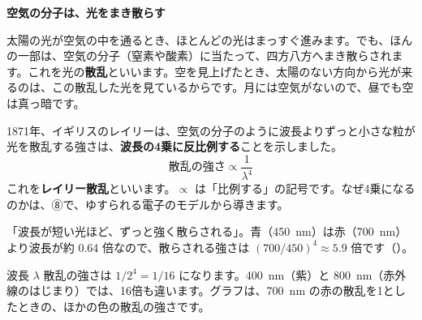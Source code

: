 \noindent\textbf{空気の分子は、光をまき散らす}\par\nobreak
\label{ph:波-13:hatena1}太陽の光が空気の中を通るとき、ほとんどの光はまっすぐ進みます。でも、ほんの一部は、空気の分子（窒素や酸素）に当たって、四方八方へまき散らされます。これを光の\textbf{散乱}といいます。空を見上げたとき、太陽のない方向から光が来るのは、この散乱した光を見ているからです。月には空気がないので、昼でも空は真っ暗です。

1871年、イギリスのレイリーは、空気の分子のように波長よりずっと小さな粒が光を散乱する強さは、\textbf{波長の4乗に反比例する}ことを示しました。
\[ \text{散乱の強さ}\propto\frac{1}{\lambda^4} \]
\label{ph:波-13:rayleigh}これを\textbf{レイリー散乱}といいます。$\propto$ は「比例する」の記号です。なぜ4乗になるのかは、⑧で、ゆすられる電子のモデルから導きます。

\begin{phyomi}
「波長が短い光ほど、ずっと強く散らされる」。青（\qty{450}{nm}）は赤（\qty{700}{nm}）より波長が約 0.64 倍なので、散らされる強さは $(700/450)^4\approx5.9$ 倍です（\nobreak{}\nobreak）。
\end{phyomi}

\begin{phbaisuru}{波長 $\lambda$}
散乱の強さは $1/2^4=1/16$ になります。\qty{400}{nm}（紫）と \qty{800}{nm}（赤外線のはじまり）では、16倍も違います。グラフは、\qty{700}{nm} の赤の散乱を1としたときの、ほかの色の散乱の強さです。
\par\vspace{2pt}\centering
{}
\end{phbaisuru}

